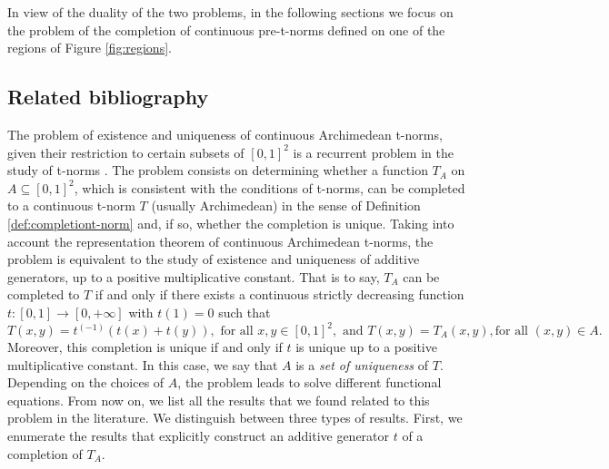 In view of the duality of the two problems, in the following sections we focus on the problem of the completion of continuous pre-t-norms defined on one of the regions of Figure \ref{fig:regions}. 


\subsection{Related bibliography}\label{subsec:related_bibliography}

The problem of existence and uniqueness of continuous Archimedean t-norms, given their restriction to certain subsets of $[0,1]^2$ is a recurrent problem in the study of t-norms \cite{Alsina2006}. The problem consists on determining whether a function  $T_A$ on $A\subseteq [0,1]^2$, which is consistent with the conditions of t-norms, can be completed to a continuous t-norm $T$ (usually Archimedean) in the sense of Definition \ref{def:completiont-norm} and, if so, whether the completion is unique. Taking into account the representation theorem of continuous Archimedean t-norms, the problem is equivalent to the study of existence and uniqueness of additive generators, up to a positive multiplicative constant. That is to say, $T_A$ can be completed to $T$ if and only if there exists a continuous strictly decreasing function $t:[0,1] \to [0,+\infty]$ with $t(1)=0$ such that
$$T(x,y) = t^{(-1)}(t(x)+t(y)), \text{ for all  } x,y \in [0,1]^2, \text{ and }  T(x,y)=T_A(x,y), \text {for all  } (x,y) \in A.$$
Moreover, this completion is unique if and only if $t$ is unique up to a positive multiplicative constant. In this case, we say that $A$ is a \emph{set of uniqueness} of $T$.\\
Depending on the choices of $A$, the problem leads to solve different functional equations. From now on, we list all the results that we found related to this problem in the literature. We distinguish between three types of results. First, we enumerate the results that explicitly construct an additive generator $t$ of a completion of $T_A$.

